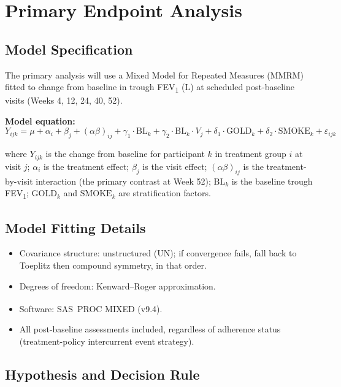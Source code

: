 \section{Primary Endpoint Analysis}

\subsection{Model Specification}

The primary analysis will use a Mixed Model for Repeated Measures (MMRM) fitted to
change from baseline in trough FEV\textsubscript{1} (L) at scheduled post-baseline visits
(Weeks 4, 12, 24, 40, 52).

\textbf{Model equation:}
\[
  Y_{ijk} = \mu + \alpha_i + \beta_j + (\alpha\beta)_{ij}
            + \gamma_1 \cdot \text{BL}_k + \gamma_2 \cdot \text{BL}_k \cdot V_j
            + \delta_1 \cdot \text{GOLD}_k + \delta_2 \cdot \text{SMOKE}_k + \varepsilon_{ijk}
\]

where $Y_{ijk}$ is the change from baseline for participant $k$ in treatment group $i$ at
visit $j$; $\alpha_i$ is the treatment effect; $\beta_j$ is the visit effect;
$(\alpha\beta)_{ij}$ is the treatment-by-visit interaction (the primary contrast at Week 52);
$\text{BL}_k$ is the baseline trough FEV\textsubscript{1}; $\text{GOLD}_k$ and
$\text{SMOKE}_k$ are stratification factors.

\subsection{Model Fitting Details}

\begin{itemize}[leftmargin=1.6em, itemsep=2pt]
  \item Covariance structure: unstructured (UN); if convergence fails, fall back to
        Toeplitz then compound symmetry, in that order.
  \item Degrees of freedom: Kenward--Roger approximation.
  \item Software: SAS\textsuperscript{\textregistered}\ PROC MIXED (v9.4).
  \item All post-baseline assessments included, regardless of adherence status
        (treatment-policy intercurrent event strategy).
\end{itemize}

\subsection{Hypothesis and Decision Rule}

